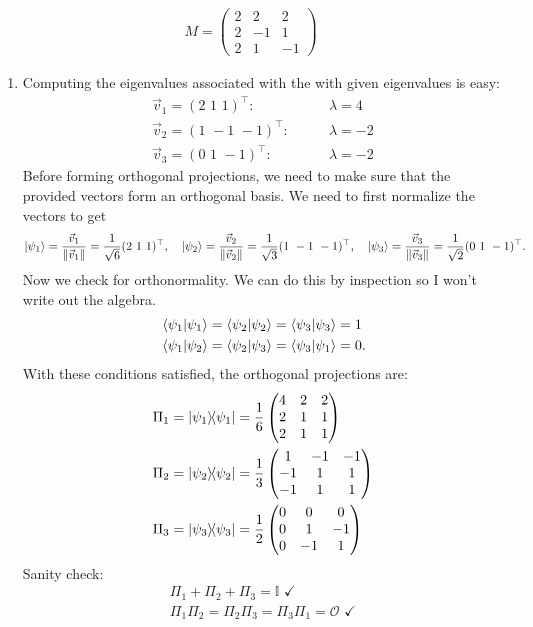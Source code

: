 \documentclass{article}
\theoremstyle{definition}
\newcommand{\f}[2]{\frac{#1}{#2}}
\begin{document}
\begin{align*}
	M = \begin{pmatrix}
		2 & 2 & 2 \\
		2 & -1 & 1 \\
		2 & 1 & -1 
	\end{pmatrix}
\end{align*}
\begin{enumerate}[label=(\alph*)]
	\item Computing the eigenvalues associated with the with given eigenvalues is easy:
	\begin{align*}
		\vec{v}_1 = (2\,\,1\,\,1)^\top: &\quad\quad \lambda = 4\\
		\vec{v}_2 = (1\,\,-1\,\,-1)^\top: &\quad\quad \lambda = -2\\
		\vec{v}_3 = (0\,\,1\,\,-1)^\top: &\quad\quad \lambda = -2
	\end{align*}
	Before forming orthogonal projections, we need to make sure that the provided vectors form an orthogonal basis.  We need to first normalize the vectors to get
	\begin{align*}
		\ket{\psi_1} = \f{\vec{v}_1}{\norm{\vec{v}_1}} = \f{1}{\sqrt{6}}(2\,\,1\,\,1)^\top , 
		\quad \ket{\psi_2} = \f{\vec{v}_2}{\norm{\vec{v}_2}} = \f{1}{\sqrt{3}}  (1\,\,-1\,\,-1)^\top, 
		\quad 
		\ket{\psi_3} = \f{\vec{v}_3}{\norm{\vec{v}_3}} = \f{1}{\sqrt{2}} (0\,\,1\,\,-1)^\top.
	\end{align*}
	Now we check for orthonormality. We can do this by inspection so I won't write out the algebra. 
	\begin{align*}
		&\braket{\psi_1} = \braket{\psi_2} = \braket{\psi_3} = 1\\
		&\bra{\psi_1}\ket{\psi_2} = \bra{\psi_2}\ket{\psi_3} = \bra{\psi_3}\ket{\psi_1} = 0.
	\end{align*}
	With these conditions satisfied, the orthogonal projections are:
	\begin{align*}
		&\Pi_1 = \ketbra{\psi_1} = \f{1}{6}\begin{pmatrix}
			4 & 2 & 2 \\
			2 & 1 & 1\\
			2 & 1 & 1
		\end{pmatrix}\\
		&\Pi_2 = \ketbra{\psi_2} = \f{1}{3}\begin{pmatrix}
			1 & -1 & -1 \\
			-1 & 1 & 1\\
			-1 & 1 & 1
		\end{pmatrix}\\
		&\Pi_3 = \ketbra{\psi_3} = \f{1}{2}\begin{pmatrix}
			0 & 0 & 0 \\
			0 & 1 & -1 \\
			0 & -1 & 1
		\end{pmatrix}
	\end{align*}
	Sanity check:
	\begin{align*}
		\Pi_1 + \Pi_2 + \Pi_3 = \mathbb{I} \,\, \checkmark\\
		\Pi_1 \Pi_2 = \Pi_2 \Pi_3 = \Pi_3 \Pi_1 = \mathcal{O} \,\, \checkmark
	\end{align*}




\end{enumerate}
\end{document}
